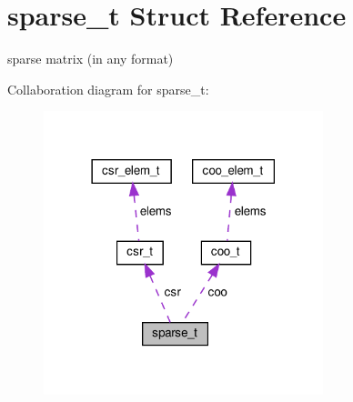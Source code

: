 \hypertarget{structsparse__t}{}\section{sparse\+\_\+t Struct Reference}
\label{structsparse__t}


sparse matrix (in any format)  




Collaboration diagram for sparse\+\_\+t\+:\nopagebreak
\begin{figure}[H]
\begin{center}
\leavevmode
\includegraphics[width=230pt]{structsparse__t__coll__graph}
\end{center}
\end{figure}
